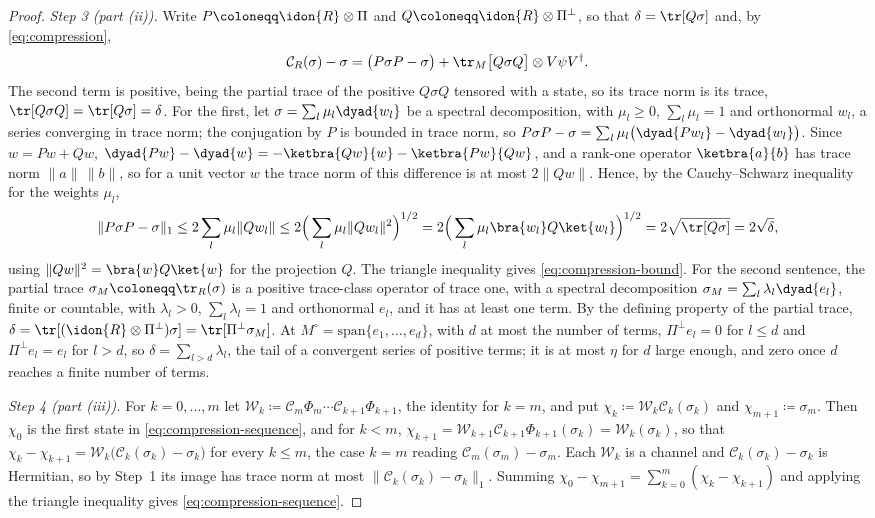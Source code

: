 \begin{proof}
\emph{Step 3 (part (ii)).} Write $P\coloneqq\idon{R}\otimes\Pi$ and
$Q\coloneqq\idon{R}\otimes\Pi^{\perp}$, so that $\delta=\tr[Q\sigma]$ and, by
\eqref{eq:compression},
\begin{equation*}
  \mathcal{C}_R(\sigma)-\sigma
  =\big(P\sigma P-\sigma\big)
  +\tr_M\big[Q\sigma Q\big]\otimes V\psi V^{\dagger} .
\end{equation*}
The second term is positive, being the partial trace of the positive
$Q\sigma Q$ tensored with a state, so its trace norm is its trace,
$\tr[Q\sigma Q]=\tr[Q\sigma]=\delta$. For the first, let
$\sigma=\sum_l\mu_l\dyad{w_l}$ be a spectral decomposition, with
$\mu_l\ge0$, $\sum_l\mu_l=1$ and orthonormal $w_l$, a series converging in
trace norm; the conjugation by $P$ is bounded in trace norm, so
$P\sigma P-\sigma=\sum_l\mu_l\big(\dyad{Pw_l}-\dyad{w_l}\big)$. Since
$w=Pw+Qw$,
$\dyad{Pw}-\dyad{w}=-\ketbra{Qw}{w}-\ketbra{Pw}{Qw}$, and a rank-one operator
$\ketbra{a}{b}$ has trace norm $\|a\|\,\|b\|$, so for a unit vector $w$
the trace norm of this difference is at most $2\|Qw\|$. Hence, by the
Cauchy--Schwarz inequality for the weights $\mu_l$,
\begin{equation*}
  \|P\sigma P-\sigma\|_1\le2\sum_l\mu_l\|Qw_l\|
  \le2\Big(\sum_l\mu_l\|Qw_l\|^2\Big)^{1/2}
  =2\Big(\sum_l\mu_l\bra{w_l}Q\ket{w_l}\Big)^{1/2}
  =2\sqrt{\tr[Q\sigma]}=2\sqrt{\delta},
\end{equation*}
using $\|Qw\|^2=\bra{w}Q\ket{w}$ for the projection $Q$. The triangle
inequality gives \eqref{eq:compression-bound}. For the second sentence, the
partial trace $\sigma_M\coloneqq\tr_R(\sigma)$ is a positive trace-class
operator of trace one, with a spectral decomposition
$\sigma_M=\sum_l\lambda_l\dyad{e_l}$, finite or countable, with $\lambda_l>0$,
$\sum_l\lambda_l=1$ and orthonormal $e_l$, and it has at least one term. By
the defining property of the partial trace,
$\delta=\tr[(\idon{R}\otimes\Pi^{\perp})\sigma]=\tr[\Pi^{\perp}\sigma_M]$. At
$M^{\circ}=\mathrm{span}\{e_1,\dots,e_d\}$, with $d$ at most the number of
terms, $\Pi^{\perp}e_l=0$ for $l\le d$ and $\Pi^{\perp}e_l=e_l$ for $l>d$, so
$\delta=\sum_{l>d}\lambda_l$, the tail of a convergent series of positive
terms; it is at most $\eta$ for $d$ large enough, and zero once $d$ reaches a
finite number of terms.

\emph{Step 4 (part (iii)).} For $k=0,\dots,m$ let
$\mathcal{W}_k\coloneqq\mathcal{C}_m\Phi_m\cdots\mathcal{C}_{k+1}\Phi_{k+1}$,
the identity for $k=m$, and put
$\chi_k\coloneqq\mathcal{W}_k\mathcal{C}_k(\sigma_k)$ and
$\chi_{m+1}\coloneqq\sigma_m$. Then $\chi_0$ is the first state in
\eqref{eq:compression-sequence}, and for $k<m$,
$\chi_{k+1}=\mathcal{W}_{k+1}\mathcal{C}_{k+1}\Phi_{k+1}(\sigma_k)
=\mathcal{W}_k(\sigma_k)$, so that
$\chi_k-\chi_{k+1}=\mathcal{W}_k\big(\mathcal{C}_k(\sigma_k)-\sigma_k\big)$
for every $k\le m$, the case $k=m$ reading
$\mathcal{C}_m(\sigma_m)-\sigma_m$. Each $\mathcal{W}_k$ is a channel and
$\mathcal{C}_k(\sigma_k)-\sigma_k$ is Hermitian, so by Step~1 its image has
trace norm at most $\|\mathcal{C}_k(\sigma_k)-\sigma_k\|_1$. Summing
$\chi_0-\chi_{m+1}=\sum_{k=0}^{m}(\chi_k-\chi_{k+1})$ and applying the
triangle inequality gives \eqref{eq:compression-sequence}.


\end{proof}
